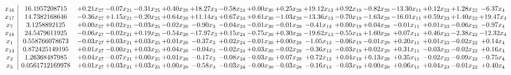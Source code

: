 \documentclass[9pt]{article}
\begin{document}
 \[\begin{array}{c| c c@{\hskip 2pt} c@{\hskip 2pt} c@{\hskip 2pt} c@{\hskip 2pt} c@{\hskip 2pt} c@{\hskip 2pt} c@{\hskip 2pt} c@{\hskip 2pt} c@{\hskip 2pt} c@{\hskip 2pt} c@{\hskip 2pt} c@{\hskip 2pt} c@{\hskip 2pt} c@{\hskip 2pt} c@{\hskip 2pt} }
 x_{16}   &  16.1957208715 & +  0.21 x_{27} & -0.07 x_{21} & -0.31 x_{25} & +  0.40 x_{20} & + 18.27 x_{3} & -0.58 x_{24} & +  0.00 x_{30} & +  0.25 x_{28} & + 19.12 x_{13} & +  0.92 x_{19} & -0.82 x_{29} & -13.30 x_{11} & +  0.12 x_{23} & +  1.28 x_{22} & -6.37 x_{4}\\
 x_{17}   &  14.7382168646 & -0.36 x_{27} & +  1.15 x_{21} & -0.20 x_{25} & +  0.64 x_{20} & + 11.14 x_{3} & +  0.67 x_{24} & +  0.61 x_{30} & -1.03 x_{28} & -13.36 x_{13} & -0.70 x_{19} & -1.63 x_{29} & -16.01 x_{11} & +  0.59 x_{23} & +  1.40 x_{22} & + 19.47 x_{4}\\
 x_{7}   &  3.1258892125 & +  0.00 x_{27} & +  0.02 x_{21} & -0.03 x_{25} & -0.02 x_{20} & -0.90 x_{3} & -0.04 x_{24} & -0.01 x_{30} & -0.01 x_{28} & -0.41 x_{13} & +  0.00 x_{19} & +  0.04 x_{29} & -0.01 x_{11} & +  0.01 x_{23} & -0.06 x_{22} & -0.97 x_{4}\\
 x_{18}   &  24.5479611925 & -0.06 x_{27} & -0.02 x_{21} & +  0.19 x_{25} & -0.54 x_{20} & -17.97 x_{3} & +  0.15 x_{24} & -0.75 x_{30} & +  0.30 x_{28} & -19.62 x_{13} & -0.55 x_{19} & +  1.60 x_{29} & +  0.07 x_{11} & +  0.46 x_{23} & -2.38 x_{22} & -12.32 x_{4}\\
 x_{1}   &  0.558766078673 & -0.03 x_{27} & +  0.03 x_{21} & +  0.03 x_{25} & +  0.01 x_{20} & -0.37 x_{3} & +  0.02 x_{24} & -0.01 x_{30} & +  0.00 x_{28} & -1.05 x_{13} & -0.06 x_{19} & -0.01 x_{29} & +  0.20 x_{11} & +  0.01 x_{23} & -0.02 x_{22} & +  0.14 x_{4}\\
 x_{14}   &  0.872425149195 & +  0.01 x_{27} & -0.00 x_{21} & +  0.03 x_{25} & +  0.04 x_{20} & -0.04 x_{3} & -0.02 x_{24} & +  0.03 x_{30} & -0.02 x_{28} & -0.36 x_{13} & -0.03 x_{19} & +  0.02 x_{29} & +  0.31 x_{11} & -0.03 x_{23} & -0.02 x_{22} & +  0.16 x_{4}\\
 x_{2}   &  1.26368487985 & +  0.04 x_{27} & -0.07 x_{21} & +  0.00 x_{25} & +  0.01 x_{20} & -0.17 x_{3} & -0.08 x_{24} & -0.03 x_{30} & +  0.07 x_{28} & +  0.72 x_{13} & +  0.04 x_{19} & +  0.13 x_{29} & +  0.35 x_{11} & -0.02 x_{23} & -0.09 x_{22} & -0.75 x_{4}\\
 x_{5}   &  0.0561712169978 & +  0.01 x_{27} & +  0.03 x_{21} & +  0.03 x_{25} & +  0.00 x_{20} & -0.58 x_{3} & -0.03 x_{24} & -0.00 x_{30} & -0.03 x_{28} & -0.16 x_{13} & -0.03 x_{19} & +  0.00 x_{29} & +  0.06 x_{11} & +  0.04 x_{23} & -0.01 x_{22} & +  0.40 x_{4}\\

\end{array}\]
\end{document}
